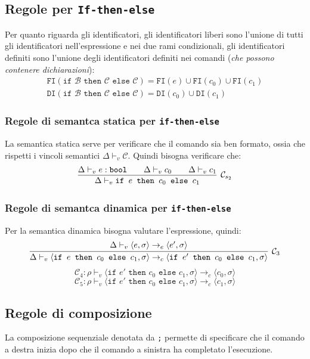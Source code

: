 \documentclass[oneside,a4paper,11pt]{book}
\theoremstyle{italicstyle}
\theoremstyle{normStyle}
\begin{document}
\subsection{Regole per \texttt{If-then-else}}
Per quanto riguarda gli identificatori, gli identificatori liberi sono l'unione 
di tutti gli identificatori nell'espressione e nei due rami condizionali, gli identificatori 
definiti sono l'unione degli identificatori definiti nei comandi (\textit{che 
possono contenere dichiarazioni}):
\begin{align*}
  \texttt{FI}(\texttt{if }\mathcal{B}\texttt{ then }\mathcal{C}\texttt{ else }\mathcal{C}) = \texttt{FI}(e) \cup \texttt{FI}(c_0)\cup\texttt{FI}(c_1) \\
  \texttt{DI}(\texttt{if }\mathcal{B}\texttt{ then }\mathcal{C}\texttt{ else }\mathcal{C})= \texttt{DI}(c_0) \cup \texttt{DI}(c_1)
\end{align*}
\subsubsection{Regole di semantca statica per \texttt{if-then-else}}
La semantica statica serve per verificare che il comando sia ben formato, ossia che rispetti i vincoli 
semantici $\Delta \vdash_v \mathcal{C}$. Quindi bisogna verificare che:
\[
  \infer[ \mathcal{C}_{s_2}]
    {
      \Delta \vdash_v \texttt{if }e\texttt{ then }c_0\texttt{ else }c_1 
    }
    {
      \Delta \vdash_v e:\texttt{bool}\qquad \Delta \vdash_v c_0 \qquad\Delta \vdash_v c_1
    }
\]
\subsubsection{Regole di semantca dinamica per \texttt{if-then-else}}
Per la semantica dinamica bisogna valutare l'espressione, quindi:
\[
  \infer[ \mathcal{C}_{3}]
    {
      \Delta \vdash_v \langle \texttt{if }e\texttt{ then }c_0\texttt{ else }c_1 , \sigma \rangle \rightarrow_c
      \langle \texttt{if }e'\texttt{ then }c_0\texttt{ else }c_1 , \sigma \rangle
    }
    {
      \Delta \vdash_v \langle e,\sigma \rangle \rightarrow_e \langle e',\sigma \rangle
    }
\]
\[
  \mathcal{C}_4: \rho \vdash_v \langle \texttt{if }e'\texttt{ then }c_0\texttt{ else }c_1 , \sigma \rangle
  \rightarrow_c \langle c_0, \sigma \rangle
\]
\[
  \mathcal{C}_5: \rho \vdash_v \langle \texttt{if }e'\texttt{ then }c_0\texttt{ else }c_1 , \sigma \rangle
  \rightarrow_c \langle c_1, \sigma \rangle
\]
\subsection{Regole di composizione}
La composizione sequenziale denotata da \verb|;| permette di specificare che  
il comando a destra inizia dopo che il comando a sinistra ha completato l'esecuzione.
\end{document}
